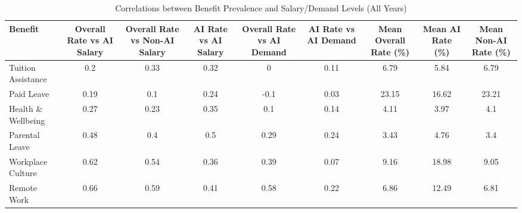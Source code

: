 \begin{table}[htbp]
\caption{Correlations between Benefit Prevalence and Salary/Demand Levels (All Years)}
\label{tab:benefit_salary_corr}
\begin{tabular}{lcccccccc}
\hline\hline
Benefit & Overall Rate vs AI Salary & Overall Rate vs Non-AI Salary & AI Rate vs AI Salary & Overall Rate vs AI Demand & AI Rate vs AI Demand & Mean Overall Rate (\%) & Mean AI Rate (\%) & Mean Non-AI Rate (\%) \\
\hline
Tuition Assistance & 0.2 & 0.33 & 0.32 & 0 & 0.11 & 6.79 & 5.84 & 6.79 \\
Paid Leave & 0.19 & 0.1 & 0.24 & -0.1 & 0.03 & 23.15 & 16.62 & 23.21 \\
Health \& Wellbeing & 0.27 & 0.23 & 0.35 & 0.1 & 0.14 & 4.11 & 3.97 & 4.1 \\
Parental Leave & 0.48 & 0.4 & 0.5 & 0.29 & 0.24 & 3.43 & 4.76 & 3.4 \\
Workplace Culture & 0.62 & 0.54 & 0.36 & 0.39 & 0.07 & 9.16 & 18.98 & 9.05 \\
Remote Work & 0.66 & 0.59 & 0.41 & 0.58 & 0.22 & 6.86 & 12.49 & 6.81 \\
\hline\hline
\end{tabular}
\end{table}
